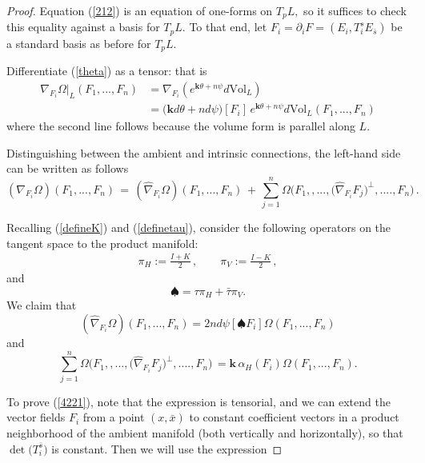\documentclass[12pt,letterpaper]{amsart}%
\numberwithin{mycounter}{section}
\theoremstyle{plain}
\numberwithin{equation}{section}
\theoremstyle{definition}
\begin{document}
\begin{proof}

Equation (\ref{212}) is an equation of one-forms on $T_{p}L,$ so it suffices to check this
equality against a basis for $T_{p}L.$  To that end, let $F_{i}=\partial _{i}F=\left( E_{i},T_{i}^{s}E_{\bar{s}}\right)$ be a standard basis as before for
$T_{p}L$.

Differentiate (\ref{theta}) as a tensor: that is
\begin{align}
\nabla_{F_{i}}\Omega\big|_{L}(F_{1},...,F_{n})  &  =\nabla_{F_{i}}\left(
e^{\mathbf{k}\theta+n\psi}d\text{Vol}_{L}\right) \label{215} \\
&  =\big(  \mathbf{k}d\theta+nd\psi\big)[F_{i}]
\,e^{\mathbf{k}\theta+n\psi}d\text{Vol}_{L}(F_{1},...,F_{n})  \label{216}
\end{align}
where the second line follows because the volume form is parallel along $L.$

Distinguishing between the ambient and intrinsic connections, the left-hand side can be written as follows
\begin{equation}
(\nabla_{F_{i}}\Omega)(F_{1},...,F_{n})\,=\,(\hat{\nabla}_{F_{i}}\Omega
)(F_{1},...,F_{n})\,+\,\sum_{j=1}^{n}\Omega\Big(F_{1},,...,\big(\hat{\nabla
}_{F_{i}}F_{j}\big)^{\perp},....,F_{n}\Big)\,.
\label{full deriv exp for Omega}%
\end{equation}

Recalling (\ref{defineK}) and (\ref{definetau}), consider the following operators on the tangent space to the product
manifold:\
\begin{align*}
\pi_{H} :=\frac{I+K}{2}\,, \qquad
\pi_{V} :=\frac{I-K}{2} \,,
\end{align*}
and 
\[
\spadesuit=\tau\pi_{H}+\bar{\tau}\pi_{V}.%
\]
We claim that%
\begin{equation} \label{4221}
(\hat{\nabla}_{F_{i}}\Omega)(F_{1},...,F_{n})=2nd\psi[\spadesuit F_{i}]
\Omega(F_{1},...,F_{n})
\end{equation}
and
\begin{equation} \label{4222}
\sum_{j=1}^{n}\Omega\Big(F_{1},,...,\big(\hat{\nabla}_{F_{i}}F_{j}%
\big)^{\perp},....,F_{n}\Big)\,=\mathbf{k\,}\alpha_{H}(F_{i})\Omega
(F_{1},...,F_{n}).
\end{equation}


To prove (\ref{4221}), note that the expression is tensorial, and we can  extend the vector fields $F_{i}$
from a point $(x,\bar{x})$ to constant coefficient vectors in a product neighborhood of the
ambient manifold (both vertically and horizontally), so that
$\det\!\bigl(T^{\bar s}_i\bigr)$ is constant. Then we will use the expression


\end{proof}
\end{document}

